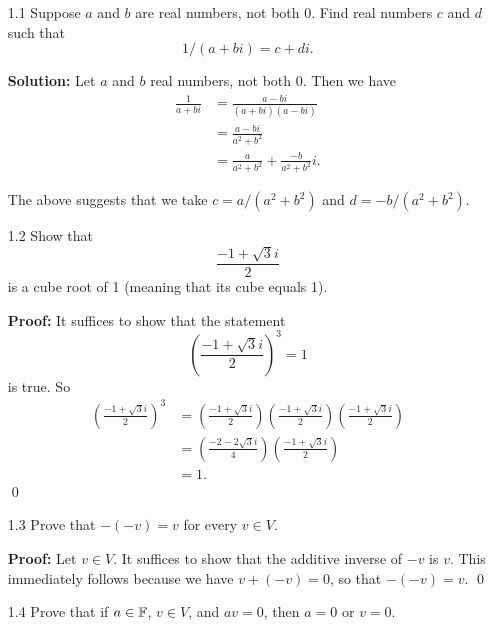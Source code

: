 \begin{enumerate}
   \item[1.1]  Suppose $a$ and $b$ are real numbers, not both 0. Find real
               numbers $c$ and $d$ such that
               $$1/(a + bi) = c + di.$$

      \textbf{Solution:} Let $a$ and $b$ real numbers, not both 0. Then we have
      \begin{align*}
         \frac{1}{a + bi} &= \frac{a - bi}{(a + bi)(a - bi)} \\
                          &= \frac{a - bi}{a^2 + b^2} \\
                          &= \frac{a}{a^2 + b^2} + \frac{-b}{a^2 + b^2}i.
      \end{align*}

      The above suggests that we take $c = a/(a^2 + b^2)$ and
      $d = -b/(a^2 + b^2)$.
   \item[1.2]  Show that
               $$\frac{-1 + \sqrt{3}i}{2}$$
               is a cube root of 1 (meaning that its cube equals 1).

      \textbf{Proof:} It suffices to show that the statement
      $$\left(\frac{-1 + \sqrt{3}i}{2}\right)^3 = 1$$
      is true. So
      \begin{align*}
         \left(\frac{-1 + \sqrt{3}i}{2}\right)^3 &=
            \left(\frac{-1 + \sqrt{3}i}{2}\right)
            \left(\frac{-1 + \sqrt{3}i}{2}\right)
            \left(\frac{-1 + \sqrt{3}i}{2}\right) \\
                                                 &=
            \left(\frac{-2 - 2\sqrt{3}i}{4}\right)
            \left(\frac{-1 + \sqrt{3}i}{2}\right) \\
                                                 &= 1.
      \end{align*} \qed
   \item[1.3]  Prove that $-(-v) = v$ for every $v \in V$.

      \textbf{Proof:} Let $v \in V$. It suffices to show that the additive
      inverse of $-v$ is $v$. This immediately follows because we have
      $v + (-v) = 0$, so that $-(-v) = v$. \qed
   \item[1.4]  Prove that if $a \in \mathbb{F}$, $v \in V$, and $av = 0$, then $a = 0$
               or $v = 0$.


\end{enumerate}
